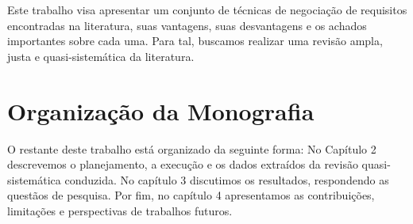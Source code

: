 Este trabalho visa apresentar um conjunto de técnicas de
negociação de requisitos encontradas na literatura, suas vantagens, suas
desvantagens e os achados importantes sobre cada uma. Para tal, buscamos realizar
uma revisão ampla, justa e quasi-sistemática da literatura.

\section{Organização da Monografia}

O restante deste trabalho está organizado da seguinte forma:
No Capítulo 2 descrevemos o planejamento, a execução e os dados extraídos da
revisão quasi-sistemática conduzida.
No capítulo 3 discutimos os resultados, respondendo as questãos de pesquisa.
Por fim, no capítulo 4 apresentamos as contribuições, limitações e perspectivas de trabalhos futuros.
